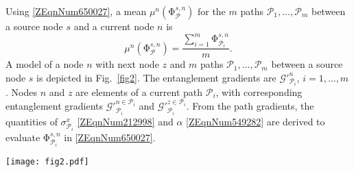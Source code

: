 \documentclass[11pt]{article}%
\newcommand{\fref}[1]{Fig.~\ref{#1}}
\begin{document}
 Using \eqref{ZEqnNum650027}, a mean ${\mu }^n\left({\mathrm{\Phi }}^{s,n}_{\mathcal{P}}\right)$ for the $m$ paths ${\mathcal{P}}_{\mathrm{1}}\mathrm{,\dots ,}{\mathcal{P}}_m$ between a source node $s$ and a current node $n$ is
\begin{equation} \label{ZEqnNum751770} 
{\mu }^n\left({\mathrm{\Phi }}^{s,n}_{\mathcal{P}}\right)\mathrm{=}\frac{\sum^m_{i\mathrm{=1}}{{\mathrm{\Phi }}^{s,n}_{{\mathcal{P}}_i}}}{m}.                                                                       
\end{equation} 
A model of a node $n$ with next node $z$ and $m$ paths ${\mathcal{P}}_{\mathrm{1}}\mathrm{,\dots ,}{\mathcal{P}}_m$ between a source node $s$ is depicted in \fref{fig2}. The entanglement gradients are ${\mathcal{G}}'^n_{{\mathcal{P}}_i}$, $i\mathrm{=1,\dots ,}m$. Nodes $n$ and $z$ are elements of a current path ${\mathcal{P}}_i$, with corresponding entanglement gradients ${\mathcal{G}}'^{n\mathrm{\in }{\mathcal{P}}_i}_{{\mathcal{P}}_i}$ and ${\mathcal{G}}'^{z\mathrm{\in }{\mathcal{P}}_i}_{{\mathcal{P}}_i}$. From the path gradients, the quantities of ${\sigma }^x_{{\mathcal{P}}_i}$ \eqref{ZEqnNum212998} and $\alpha $ \eqref{ZEqnNum549282} are derived to evaluate ${\mathrm{\Phi }}^{s,n}_{{\mathcal{P}}_i}$ in \eqref{ZEqnNum650027}.
 \\

\begin{figure*}[h!]
\vspace{-0.6cm}
 \begin{center}
 	 \texttt{[image: fig2.pdf]}

\caption{A model of $m$ paths ${\mathcal{P}}_{\mathrm{1}}\mathrm{,\dots ,}{\mathcal{P}}_m$ between a source node $s$ and a current node $n$. The paths have entanglement gradients ${\mathcal{G}}'^n_{{\mathcal{P}}_i}$, $i\mathrm{=1,}\mathrm{\dots ,}m$. Current node $n$ and next node $z$ are elements of a current path ${\mathcal{P}}_i$ (blue), with ${\mathcal{G}}'^{n\mathrm{\in }{\mathcal{P}}_i}_{{\mathcal{P}}_i}$ in $n$ and ${\mathcal{G}}'^{z\mathrm{\in }{\mathcal{P}}_i}_{{\mathcal{P}}_i}$ in $z$.}
\label{fig2}
\end{center}
\end{figure*}
\end{document}
